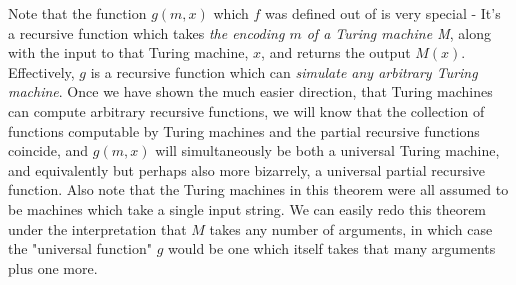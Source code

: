 Note that the function $g(m,x)$ which $f$ was defined out of is very special - It's a recursive function which takes \textit{the encoding $m$ of a Turing machine M}, along with the input to that Turing machine, $x$, and returns the output $M(x)$. Effectively, $g$ is a recursive function which can \textit{simulate any arbitrary Turing machine}. Once we have shown the much easier direction, that Turing machines can compute arbitrary recursive functions, we will know that the collection of functions computable by Turing machines and the partial recursive functions coincide, and $g(m,x)$ will simultaneously be both a universal Turing machine, and equivalently but perhaps also more bizarrely, a universal partial recursive function. Also note that the Turing machines in this theorem were all assumed to be machines which take a single input string. We can easily redo this theorem under the interpretation that $M$ takes any number of arguments, in which case the "universal function" $g$ would be one which itself takes that many arguments plus one more.
\iffalse
